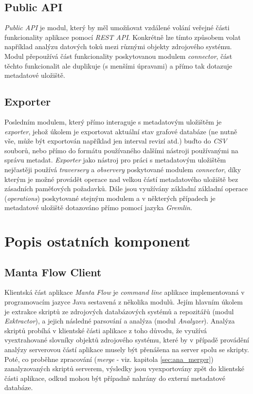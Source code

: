 \subsection{Public API}
\label{sec:ana_public}
\textit{Public API} je modul, který by měl umožňovat vzdálené volání veřejné části funkcionality aplikace pomocí \textit{REST API}. Konkrétně lze tímto způsobem volat například analýzu datových toků mezi různými objekty zdrojového systému. Modul přepoužívá část funkcionality poskytovanou modulem \textit{connector}, část těchto funkcionalit ale duplikuje (s menšími úpravami) a přímo tak dotazuje metadatové uložiště.

\subsection{Exporter}
\label{sec:ana_exporter}
Posledním modulem, který přímo interaguje s metadatovým uložištěm je \textit{exporter}, jehož úkolem je exportovat aktuální stav grafové databáze (ne nutně vše, může být exportován například jen interval revizí atd.) buďto do \textit{CSV} souborů, nebo přímo do formátu používaného dalšími nástroji používanými na správu metadat. \textit{Exporter} jako nástroj pro práci s metadatovým uložištěm nejčastěji používá \textit{traversery} a \textit{observery} poskytované modulem \textit{connector}, díky kterým je možné provádět operace nad velkou částí metadatového uložiště bez zásadních paměťových požadavků. Dále jsou využívány základní základní operace (\textit{operations}) poskytované stejným modulem a v některých případech je metadatové uložiště dotazováno přímo pomocí jazyka \textit{Gremlin}.


\section{Popis ostatních komponent}
\label{sec:ana_other}
\subsection{Manta Flow Client}
\label{sec:ana_cli}
Klientská část aplikace \textit{Manta Flow} je \textit{command line} aplikace implementovaná v programovacím jazyce Java sestavená z několika modulů. Jejím hlavním úkolem je extrakce skriptů ze zdrojových databázových systémů a repozitářů (modul \textit{Exktractor}), a jejich následné parsování a analýza (modul \textit{Analyzer}). Analýza skriptů probíhá v klientské části aplikace z toho důvodu, že využívá vyextrahované slovníky objektů zdrojového systému, které by v případě provádění analýzy serverovou částí aplikace musely být přenášena na server spolu se skripty. Poté, co proběhne zpracování (\textit{merge} - viz. kapitola \ref{sec:ana_merger}) zanalyzovaných skriptů serverem, výsledky jsou vyexportovány zpět do klientské části aplikace, odkud mohou být případně nahrány do externí metadatové databáze.

